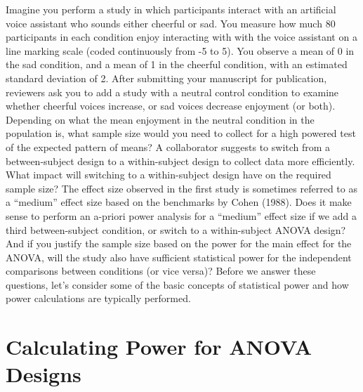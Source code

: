 \documentclass[
  ,jou,floatsintext]{apa6}
\begin{document}
Imagine you perform a study in which participants interact with an artificial voice assistant who sounds either cheerful or sad.
You measure how much 80 participants in each condition enjoy interacting with with the voice assistant on a line marking scale (coded continuously from -5 to 5).
You observe a mean of 0 in the sad condition, and a mean of 1 in the cheerful condition, with an estimated standard deviation of 2.
After submitting your manuscript for publication, reviewers ask you to add a study with a neutral control condition to examine whether cheerful voices increase, or sad voices decrease enjoyment (or both).
Depending on what the mean enjoyment in the neutral condition in the population is, what sample size would you need to collect for a high powered test of the expected pattern of means?
A collaborator suggests to switch from a between-subject design to a within-subject design to collect data more efficiently.
What impact will switching to a within-subject design have on the required sample size?
The effect size observed in the first study is sometimes referred to as a \enquote{medium} effect size based on the benchmarks by Cohen (1988).
Does it make sense to perform an a-priori power analysis for a \enquote{medium} effect size if we add a third between-subject condition, or switch to a within-subject ANOVA design?
And if you justify the sample size based on the power for the main effect for the ANOVA, will the study also have sufficient statistical power for the independent comparisons between conditions (or vice versa)?
Before we answer these questions, let's consider some of the basic concepts of statistical power and how power calculations are typically performed.

\hypertarget{calculating-power-for-anova-designs}{%
\section{Calculating Power for ANOVA Designs}\label{calculating-power-for-anova-designs}}
\end{document}
